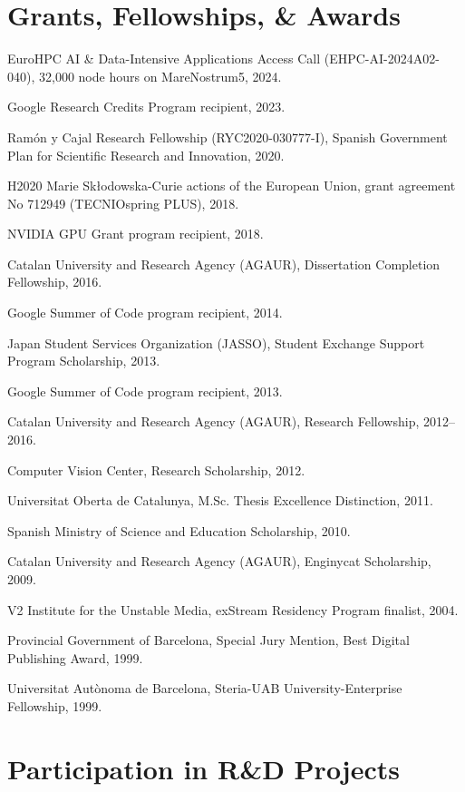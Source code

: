 \documentclass[11pt]{article}
\newenvironment{entries}{%
  \begin{list}{}{\setlength{\leftmargin}{3em}\setlength{\itemindent}{-1.5em}%
    \setlength{\itemsep}{0.35em}\setlength{\parsep}{0pt}\setlength{\topsep}{0.2em}}}%
  {\end{list}}
\begin{document}
\section*{Grants, Fellowships, \& Awards}
\begin{entries}
\item EuroHPC AI \& Data-Intensive Applications Access Call (EHPC-AI-2024A02-040), 32,000 node hours on MareNostrum5, 2024.
\item Google Research Credits Program recipient, 2023.
\item Ramón y Cajal Research Fellowship (RYC2020-030777-I), Spanish Government Plan for Scientific Research and Innovation, 2020.
\item H2020 Marie Skłodowska-Curie actions of the European Union, grant agreement No 712949 (TECNIOspring PLUS), 2018.
\item NVIDIA GPU Grant program recipient, 2018.
\item Catalan University and Research Agency (AGAUR), Dissertation Completion Fellowship, 2016.
\item Google Summer of Code program recipient, 2014.
\item Japan Student Services Organization (JASSO), Student Exchange Support Program Scholarship, 2013.
\item Google Summer of Code program recipient, 2013.
\item Catalan University and Research Agency (AGAUR), Research Fellowship, 2012--2016.
\item Computer Vision Center, Research Scholarship, 2012.
\item Universitat Oberta de Catalunya, M.Sc. Thesis Excellence Distinction, 2011.
\item Spanish Ministry of Science and Education Scholarship, 2010.
\item Catalan University and Research Agency (AGAUR), Enginycat Scholarship, 2009.
\item V2 Institute for the Unstable Media, exStream Residency Program finalist, 2004.
\item Provincial Government of Barcelona, Special Jury Mention, Best Digital Publishing Award, 1999.
\item Universitat Autònoma de Barcelona, Steria-UAB University-Enterprise Fellowship, 1999.
\end{entries}

\section*{Participation in R\&D Projects}
\end{document}
